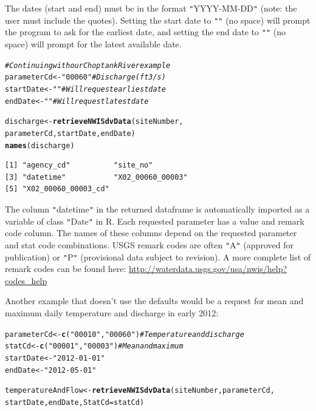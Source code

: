 \documentclass[a4paper,11pt]{article}\usepackage[]{graphicx}\usepackage[]{color}
\makeatletter
\newcommand{\hlstr}[1]{\textcolor[rgb]{0.192,0.494,0.8}{#1}}%
\newcommand{\hlcom}[1]{\textcolor[rgb]{0.678,0.584,0.686}{\textit{#1}}}%
\newcommand{\hlstd}[1]{\textcolor[rgb]{0.345,0.345,0.345}{#1}}%
\newcommand{\hlkwb}[1]{\textcolor[rgb]{0.69,0.353,0.396}{#1}}%
\newcommand{\hlkwc}[1]{\textcolor[rgb]{0.333,0.667,0.333}{#1}}%
\newcommand{\hlkwd}[1]{\textcolor[rgb]{0.737,0.353,0.396}{\textbf{#1}}}%
\newenvironment{kframe}{%
 \def\at@end@of@kframe{}%
 \ifinner\ifhmode%
  \def\at@end@of@kframe{\end{minipage}}%
  \begin{minipage}{\columnwidth}%
 \fi\fi%
 \def\FrameCommand##1{\hskip\@totalleftmargin \hskip-\fboxsep
 \colorbox{shadecolor}{##1}\hskip-\fboxsep
     \hskip-\linewidth \hskip-\@totalleftmargin \hskip\columnwidth}%
 \MakeFramed {\advance\hsize-\width
   \@totalleftmargin\z@ \linewidth\hsize
   \@setminipage}}%
 {\par\unskip\endMakeFramed%
 \at@end@of@kframe}
\newenvironment{knitrout}{}{} %
\makeatother
\begin{document}
The dates (start and end) must be in the format \texttt{"}YYYY-MM-DD\texttt{"} (note: the user must include the quotes).  Setting the start date to \texttt{"}\texttt{"} (no space) will prompt the program to ask for the earliest date, and setting the end date to \texttt{"}\texttt{"} (no space) will prompt for the latest available date.

\begin{knitrout}
\color{fgcolor}\begin{kframe}
\begin{alltt}
\hlcom{# Continuing with our Choptank River example}
\hlstd{parameterCd} \hlkwb{<-} \hlstr{"00060"}  \hlcom{# Discharge (ft3/s)}
\hlstd{startDate} \hlkwb{<-} \hlstr{""}  \hlcom{# Will request earliest date}
\hlstd{endDate} \hlkwb{<-} \hlstr{""} \hlcom{# Will request latest date}

\hlstd{discharge} \hlkwb{<-} \hlkwd{retrieveNWISdvData}\hlstd{(siteNumber,}
                    \hlstd{parameterCd, startDate, endDate)}
\hlkwd{names}\hlstd{(discharge)}
\end{alltt}
\begin{verbatim}
[1] "agency_cd"          "site_no"           
[3] "datetime"           "X02_00060_00003"   
[5] "X02_00060_00003_cd"
\end{verbatim}
\end{kframe}
\end{knitrout}

The column \texttt{"}datetime\texttt{"} in the returned dataframe is automatically imported as a variable of class \texttt{"}Date\texttt{"} in R. Each requested parameter has a value and remark code column.  The names of these columns depend on the requested parameter and stat code combinations. USGS remark codes are often \texttt{"}A\texttt{"} (approved for publication) or \texttt{"}P\texttt{"} (provisional data subject to revision). A more complete list of remark codes can be found here:
\url{http://waterdata.usgs.gov/usa/nwis/help?codes_help}

Another example that doesn't use the defaults would be a request for mean and maximum daily temperature and discharge in early 2012:
\begin{knitrout}
\color{fgcolor}\begin{kframe}
\begin{alltt}
\hlstd{parameterCd} \hlkwb{<-} \hlkwd{c}\hlstd{(}\hlstr{"00010"}\hlstd{,}\hlstr{"00060"}\hlstd{)}  \hlcom{# Temperature and discharge}
\hlstd{statCd} \hlkwb{<-} \hlkwd{c}\hlstd{(}\hlstr{"00001"}\hlstd{,}\hlstr{"00003"}\hlstd{)}  \hlcom{# Mean and maximum}
\hlstd{startDate} \hlkwb{<-} \hlstr{"2012-01-01"}
\hlstd{endDate} \hlkwb{<-} \hlstr{"2012-05-01"}

\hlstd{temperatureAndFlow} \hlkwb{<-} \hlkwd{retrieveNWISdvData}\hlstd{(siteNumber, parameterCd,}
        \hlstd{startDate, endDate,} \hlkwc{StatCd}\hlstd{=statCd)}
\end{alltt}
\end{kframe}
\end{knitrout}
\end{document}
